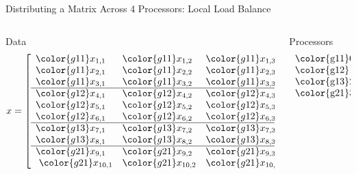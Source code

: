 \begin{frame}
\begin{exampleblock}{Distributing a Matrix Across 4 Processors: Local Load Balance}
  \begin{columns}[t,onlytextwidth]
    \begin{column}{0.5\textwidth}
      \hfill Data \hfill\ 
      \begin{align*}
      x &= \left[
            \begin{array}{lll}
            \color{g11}x_{1,1} & \color{g11}x_{1,2} & \color{g11}x_{1,3} \\
            \color{g11}x_{2,1} & \color{g11}x_{2,2} & \color{g11}x_{2,3} \\
            \color{g11}x_{3,1} & \color{g11}x_{3,2} & \color{g11}x_{3,3} \\\hline
            \color{g12}x_{4,1} & \color{g12}x_{4,2} & \color{g12}x_{4,3} \\
            \color{g12}x_{5,1} & \color{g12}x_{5,2} & \color{g12}x_{5,3} \\
            \color{g12}x_{6,1} & \color{g12}x_{6,2} & \color{g12}x_{6,3} \\\hline
            \color{g13}x_{7,1} & \color{g13}x_{7,2} & \color{g13}x_{7,3} \\
            \color{g13}x_{8,1} & \color{g13}x_{8,2} & \color{g13}x_{8,3} \\\hline
            \color{g21}x_{9,1} & \color{g21}x_{9,2} & \color{g21}x_{9,3} \\\
            \color{g21}x_{10,1} & \color{g21}x_{10,2} & \color{g21}x_{10,3} \\
            \end{array}
      \right]_{10\times 3}
      \end{align*}
    \end{column}
    \begin{column}{0.5\textwidth}
    \hfill Processors \hfill\ 
      \begin{align*}
      \begin{tabular}{l}
        \color{g11}0 \\
        \color{g12}1 \\
        \color{g13}2 \\
        \color{g21}3 
      \end{tabular}
      \end{align*}
    \end{column}
  \end{columns}
\end{exampleblock}
\end{frame}





